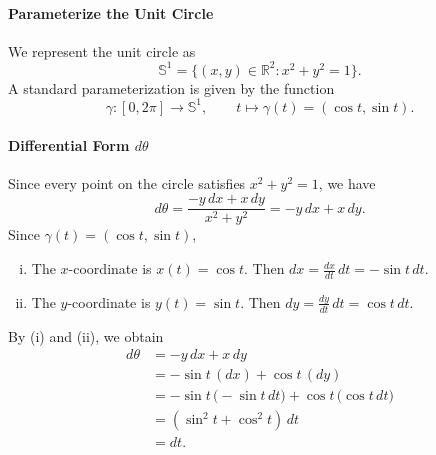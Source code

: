 \documentclass[11pt,openany]{article}
\begin{document}
\begin{center}
\end{center}

\paragraph{Parameterize the Unit Circle}

We represent the unit circle as \[
\mathbb{S}^1 = \{(x,y) \in \mathbb{R}^2 : x^2+y^2 = 1\}.
\] A standard parameterization is given by the function \[
\gamma: [0, 2\pi] \to \mathbb{S}^1,\qquad t\mapsto \gamma(t) = (\cos t, \sin t).
\] 
\paragraph{Differential Form $d\theta$} Since every point on the circle satisfies \(x^2+y^2 = 1\), we have \[
d\theta = \frac{-y\,dx + x\,dy}{x^2+y^2} = -y\,dx + x\,dy.
\] Since \(\gamma(t) = (\cos t, \sin t)\), \begin{enumerate}[(i)]
	\item The \(x\)-coordinate is $x(t) = \cos t$. Then $\displaystyle
	dx = \frac{dx}{dt}\,dt = -\sin t\,dt.$
	\item The \(y\)-coordinate is $y(t) = \sin t$. Then $\displaystyle
	dy = \frac{dy}{dt}\,dt = \cos t\,dt.$
\end{enumerate}
By (i) and (ii), we obtain \begin{align*}
d\theta &= -y\,dx + x\,dy \\
&= -\sin t\,(dx) + \cos t\,(dy) \\
&= -\sin t\,\bigl(-\sin t\,dt\bigr) + \cos t\,\bigl(\cos t\,dt\bigr) \\
&= (\sin^2 t+\cos^2 t)\, dt \\
&= dt.
\end{align*}
\end{document}
